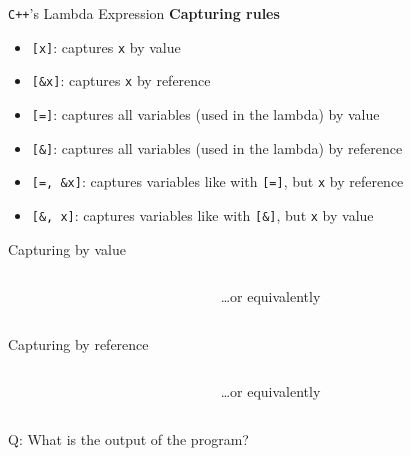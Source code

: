 \begin{frame}[fragile]{\texttt{C++}'s Lambda Expression}
    \textbf{Capturing rules}
    \begin{itemize}
        \item \texttt{[x]}: captures \texttt{x} by value
        \item \texttt{[\&x]}: captures \texttt{x} by reference
        \item \texttt{[=]}: captures all variables (used in the lambda) by value
        \item \texttt{[\&]}: captures all variables (used in the lambda) by reference
        \item \texttt{[=, \&x]}: captures variables like with \texttt{[=]}, but \texttt{x} by reference
        \item \texttt{[\&, x]}: captures variables like with \texttt{[\&]}, but \texttt{x} by value
    \end{itemize}
\end{frame}

\begin{frame}[fragile]{Capturing by value}
    \begin{columns}[t]
        \begin{column}{.45\textwidth}
        \end{column}
        \begin{column}{.45\textwidth}
            \ldots or equivalently
        \end{column}
    \end{columns}
\end{frame}

\begin{frame}[fragile]{Capturing by reference}
    \begin{columns}[t]
        \begin{column}{.45\textwidth}
        \end{column}
        \begin{column}{.45\textwidth}
            \ldots or equivalently
        \end{column}
    \end{columns}
\end{frame}

\begin{frame}[fragile]{Q: What is the output of the program?}

\end{frame}

